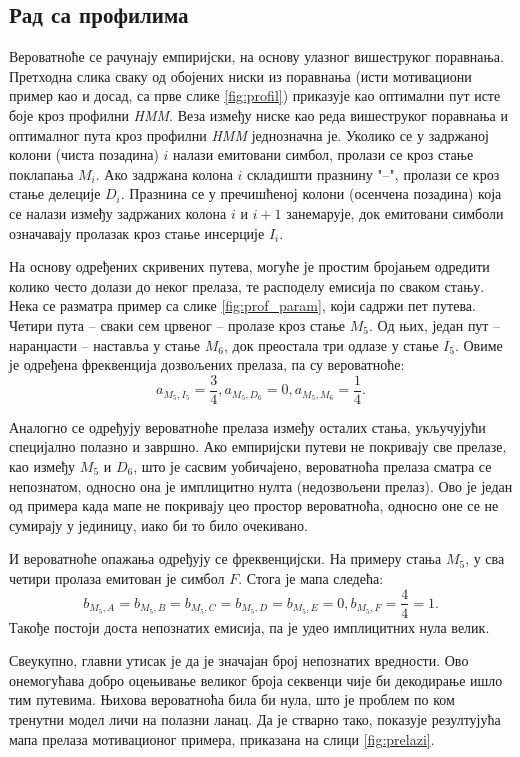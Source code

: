 \documentclass[12pt,oneside]{memoir}
\begin{document}
\begin{CJK}{UTF8}{ipxm}
\section{Рад са профилима}
Вероватноће се рачунају емпиријски, на основу улазног вишеструког поравнања. Претходна слика сваку од обојених ниски из поравнања (исти мотивациони пример као и досад, са прве слике \ref{fig:profil}) приказује као оптимални пут исте боје кроз профилни \textit{HMM}. Веза између ниске као реда вишеструког поравнања и оптималног пута кроз профилни \textit{HMM} једнозначна је. Уколико се у задржаној колони (чиста позадина) $i$ налази емитовани симбол, пролази се кроз стање поклапања $M_i$. Ако задржана колона $i$ складишти празнину "--", пролази се кроз стање делеције $D_i$. Празнина се у пречишћеној колони (осенчена позадина) која се налази између задржаних колона $i$ и $i+1$ занемарује, док емитовани симболи означавају пролазак кроз стање инсерције $I_i$.

На основу одређених скривених путева, могуће је простим бројањем одредити колико често долази до неког прелаза, те расподелу емисија по сваком стању. Нека се разматра пример са слике \ref{fig:prof_param}, који садржи пет путева. Четири пута -- сваки сем црвеног -- пролазе кроз стање $M_5$. Од њих, један пут -- наранџасти -- наставља у стање $M_6$, док преостала три одлазе у стање $I_5$. Овиме је одређена фреквенција дозвољених прелаза, па су вероватноће: $$a_{M_5, I_5} = \frac{3}{4}, a_{M_5, D_6} = 0, a_{M_5, M_6} = \frac{1}{4}.$$

Аналогно се одређују вероватноће прелаза између осталих стања, укључујући специјално полазно и завршно. Ако емпиријски путеви не покривају све прелазе, као између $M_5$ и $D_6$, што је сасвим уобичајено, вероватноћа прелаза сматра се непознатом, односно она је имплицитно нулта (недозвољени прелаз). Ово је један од примера када мапе не покривају цео простор вероватноћа, односно оне се не сумирају у јединицу, иако би то било очекивано.

И вероватноће опажања одређују се фреквенцијски. На примеру стања $M_5$, у сва четири пролаза емитован је симбол $F$. Стога је мапа следећа: $$b_{M_5, A} = b_{M_5, B} = b_{M_5, C} = b_{M_5, D}= b_{M_5, E} = 0, b_{M_5, F} = \frac{4}{4} = 1.$$ Такође постоји доста непознатих емисија, па је удео имплицитних нула велик.

Свеукупно, главни утисак је да је значајан број непознатих вредности. Ово онемогућава добро оцењивање великог броја секвенци чије би декодирање ишло тим путевима. Њихова вероватноћа била би нула, што је проблем по ком тренутни модел личи на полазни ланац. Да је стварно тако, показује резултујућа мапа прелаза мотивационог примера, приказана на слици \ref{fig:prelazi}.


\end{CJK}
\end{document}
